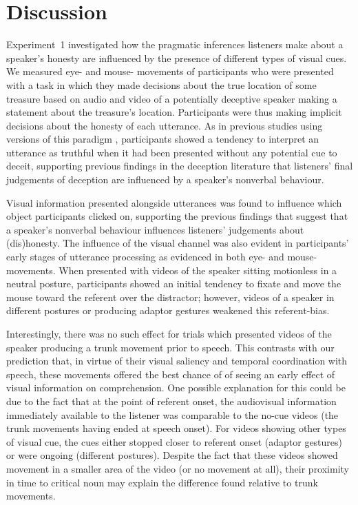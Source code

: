\documentclass[a4paper,man,natbib]{apa6}
\begin{document}
\section{Discussion}
Experiment~1 investigated how the pragmatic inferences listeners make about a speaker's honesty are influenced by the presence of different types of visual cues. 
We measured eye- and mouse- movements of participants who were presented with a task in which they made decisions about the true location of some treasure based on audio and video of a potentially deceptive speaker making a statement about the treasure's location.
Participants were thus making implicit decisions about the honesty of each utterance.
As in previous studies using versions of this paradigm \citep{Loy2017, King2018}, participants showed a tendency to interpret an utterance as truthful when it had been presented without any potential cue to deceit, supporting previous findings in the deception literature that listeners' final judgements of deception are influenced by a speaker's nonverbal behaviour.

Visual information presented alongside utterances was found to influence which object participants clicked on, supporting the previous findings that suggest that a speaker's nonverbal behaviour influences listeners' judgements about (dis)honesty.
The influence of the visual channel was also evident in participants' early stages of utterance processing as evidenced in both eye- and mouse- movements. 
When presented with videos of the speaker sitting motionless in a neutral posture, participants showed an initial tendency to fixate and move the mouse toward the referent over the distractor; however, videos of a speaker in different postures or producing adaptor gestures weakened this referent-bias.

Interestingly, there was no such effect for trials which presented videos of the speaker producing a trunk movement prior to speech.
This contrasts with our prediction that, in virtue of their visual saliency and temporal coordination with speech, these movements offered the best chance of  of seeing an early effect of visual information on comprehension.
One possible explanation for this could be due to the fact that at the point of referent onset, the audiovisual information immediately available to the listener was comparable to the no-cue videos (the trunk movements having ended at speech onset).
For videos showing other types of visual cue, the cues either stopped closer to referent onset (adaptor gestures) or were ongoing (different postures).
Despite the fact that these videos showed movement in a smaller area of the video (or no movement at all), their proximity in time to critical noun may explain the difference found relative to trunk movements.
\end{document}
